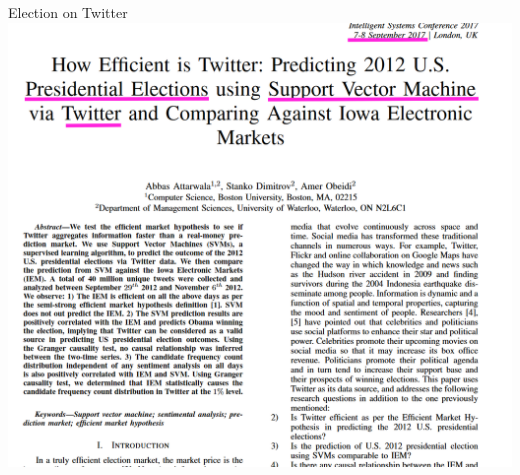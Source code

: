 
\begin{frame}{Election on Twitter}
	\includegraphics[width=\linewidth, keepaspectratio]{pictures/TwitterElection2012/Twitter_Election_2012.png}
\end{frame}


